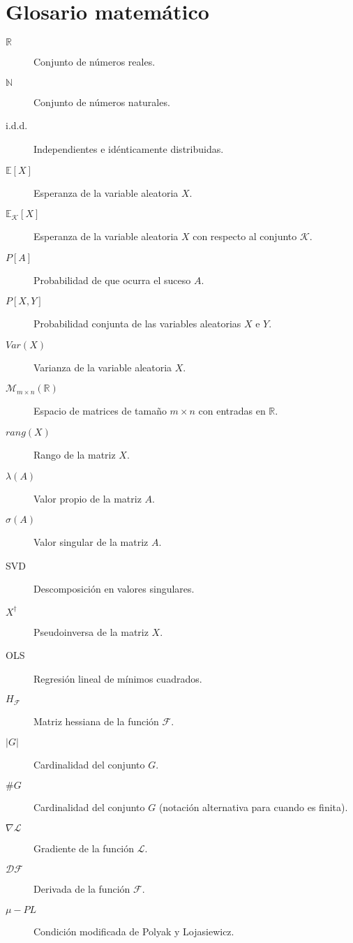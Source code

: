 
\chapter*{Glosario matemático}

\begin{description} 
  \item[$\mathbb{R}$] Conjunto de números reales.
  \item[$\mathbb{N}$] Conjunto de números naturales.
  \item[i.d.d.] Independientes e idénticamente distribuidas.
  \item[${\mathbb{E}[X]}$] Esperanza de la variable aleatoria $X$.
  \item[${\mathbb{E}_{\mathcal{K}}[X]}$] Esperanza de la variable aleatoria $X$ con respecto al conjunto $\mathcal{K}$.
  \item[${P[A]}$] Probabilidad de que ocurra el suceso $A$.
  \item[${P[X, Y]}$] Probabilidad conjunta de las variables aleatorias $X$ e $Y$.
  \item[$Var(X)$] Varianza de la variable aleatoria $X$.
  \item[$\mathcal{M}_{m \times n}(\mathbb{R})$] Espacio de matrices de tamaño $m \times n$ con entradas en $\mathbb{R}$.
  \item[$rang(X)$] Rango de la matriz $X$. 
  \item[$\lambda(A)$] Valor propio de la matriz $A$.
  \item[$\sigma(A)$] Valor singular de la matriz $A$.
  \item[SVD] Descomposición en valores singulares.
  \item[$X^{\dagger}$] Pseudoinversa de la matriz $X$.
  \item[OLS] Regresión lineal de mínimos cuadrados.
  \item[$H_{\mathcal{F}}$] Matriz hessiana de la función $\mathcal{F}$.
  \item[$|G|$] Cardinalidad del conjunto $G$.
  \item[$\#G$] Cardinalidad del conjunto $G$ (notación alternativa para cuando es finita).
  \item[$\nabla\mathcal{L}$] Gradiente de la función $\mathcal{L}$.
  \item[$\mathcal{DF}$] Derivada de la función $\mathcal{F}$.
  \item[$\mu-PL$] Condición modificada de Polyak y Lojasiewicz.

\end{description}
